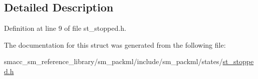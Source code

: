 \subsection{Detailed Description}


Definition at line 9 of file st\+\_\+stopped.\+h.



The documentation for this struct was generated from the following file\+:\begin{DoxyCompactItemize}
\item 
smacc\+\_\+sm\+\_\+reference\+\_\+library/sm\+\_\+packml/include/sm\+\_\+packml/states/\hyperlink{st__stopped_8h}{st\+\_\+stopped.\+h}\end{DoxyCompactItemize}
